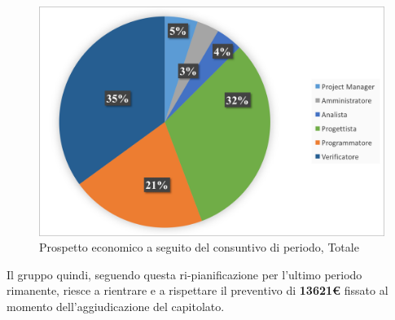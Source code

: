 \begin{figure}[H]
	\centering
	\includegraphics[scale=0.7]{Immagini/GraficiCONS/TOTCONS.png}
	\caption{Prospetto economico a seguito del consuntivo di periodo, Totale}
\end{figure}

Il gruppo quindi, seguendo questa ri-pianificazione per l'ultimo periodo rimanente, riesce a rientrare e a rispettare il preventivo di \textbf{13621\euro} fissato al momento dell'aggiudicazione del capitolato.